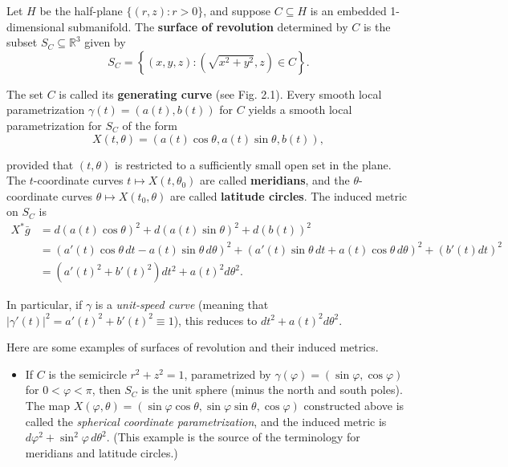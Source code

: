\begin{example}
\label{ex:surfaces-of-revolution}
\leanok
{}

Let $H$ be the half-plane $\{(r,z) : r > 0\}$, and suppose $C \subseteq H$ is an embedded 1-dimensional submanifold. The \textbf{surface of revolution} determined by $C$ is the subset $S_C \subseteq \mathbb{R}^3$ given by
\[
S_C = \left\{(x,y,z) : \left(\sqrt{x^2 + y^2}, z\right) \in C\right\}.
\]

The set $C$ is called its \textbf{generating curve} (see Fig. 2.1). Every smooth local parametrization $\gamma(t) = (a(t), b(t))$ for $C$ yields a smooth local parametrization for $S_C$ of the form
\begin{equation}
X(t, \theta) = (a(t) \cos \theta, a(t) \sin \theta, b(t)), \tag{2.11}
\end{equation}

provided that $(t, \theta)$ is restricted to a sufficiently small open set in the plane. The $t$-coordinate curves $t \mapsto X(t, \theta_0)$ are called \textbf{meridians}, and the $\theta$-coordinate curves $\theta \mapsto X(t_0, \theta)$ are called \textbf{latitude circles}. The induced metric on $S_C$ is
\begin{align*}
X^*\bar{g} &= d(a(t)\cos\theta)^2 + d(a(t)\sin\theta)^2 + d(b(t))^2 \\
&= (a'(t)\cos\theta \, dt - a(t)\sin\theta \, d\theta)^2 + (a'(t)\sin\theta \, dt + a(t)\cos\theta \, d\theta)^2 + (b'(t)dt)^2 \\
&= (a'(t)^2 + b'(t)^2)dt^2 + a(t)^2 d\theta^2.
\end{align*}

In particular, if $\gamma$ is a \emph{unit-speed curve} (meaning that $|\gamma'(t)|^2 = a'(t)^2 + b'(t)^2 \equiv 1$), this reduces to $dt^2 + a(t)^2 d\theta^2$.

Here are some examples of surfaces of revolution and their induced metrics.

\begin{itemize}
\item If $C$ is the semicircle $r^2 + z^2 = 1$, parametrized by $\gamma(\varphi)=(\sin\varphi, \cos\varphi)$ for $0 < \varphi < \pi$, then $S_C$ is the unit sphere (minus the north and south poles). The map $X(\varphi, \theta) = (\sin\varphi\cos\theta, \sin\varphi\sin\theta, \cos\varphi)$ constructed above is called the \emph{spherical coordinate parametrization}, and the induced metric is $d\varphi^2 + \sin^2\varphi \, d\theta^2$. (This example is the source of the terminology for meridians and latitude circles.)


\end{itemize}
\end{example}
